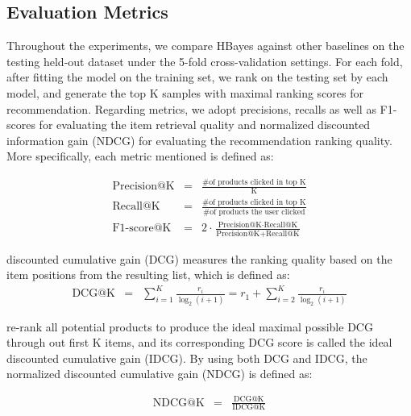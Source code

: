 {\subsection{Evaluation Metrics}
Throughout the experiments, we compare HBayes against other baselines on the testing held-out dataset under the 5-fold cross-validation settings.  For each fold, after fitting the model on the training set, we rank on the testing set by each model, and generate the top K samples with maximal ranking scores for recommendation.  Regarding metrics, we adopt precisions, recalls as well as F1-scores for evaluating the item retrieval quality and normalized discounted information gain (NDCG) for evaluating the recommendation ranking quality.  More specifically, each metric mentioned is defined as:

\begin{eqnarray}
\text{Precision@K} & = & \frac{\text{\# of products clicked in top K}}{\text{K}} \nonumber \\
\text{Recall@K}      & = & \frac{\text{\# of products clicked in top K}}{\text{\# of products the user clicked}} \nonumber \\
\text{F1-score@K} & = & 2\cdot\frac{\text{Precision@K} \cdot \text{Recall@K}}{\text{Precision@K} + \text{Recall@K}}  \nonumber
\end{eqnarray}

discounted cumulative gain (DCG) measures the ranking quality based on the item positions from the resulting list, which is defined as:
\begin{eqnarray}
\text{DCG@K} & = & \sum_{i=1}^K\frac{r_i}{\log_2(i+1)} =  r_1 + \sum_{i=2}^K\frac{r_i}{\log_2(i+1)}\nonumber
\end{eqnarray}

re-rank all potential products to produce the ideal maximal possible DCG through out first K items, and its corresponding DCG score is called the ideal discounted cumulative gain (IDCG).  By using both DCG and IDCG, the normalized discounted cumulative gain (NDCG) is defined as:

\begin{eqnarray}
\text{NDCG@K} & = & \frac{\text{DCG@K}}{\text{IDCG@K}}\nonumber
\end{eqnarray}

}
